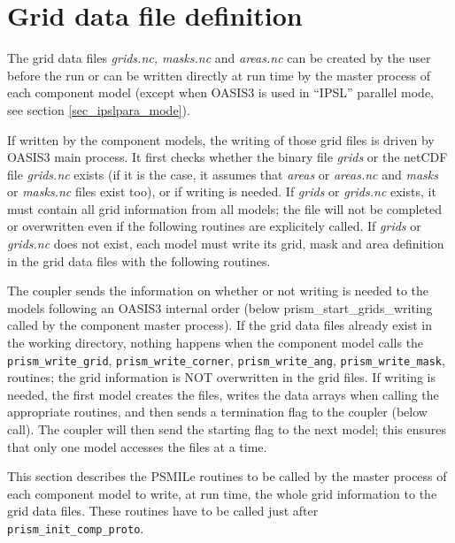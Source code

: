 \section{Grid data file definition}
\label{subsubsec_griddef}

The grid data files {\em grids.nc, masks.nc} and {\em areas.nc} can be
created by the user before the run or can be written directly at run
time by the master process of each component model (except when
  OASIS3 is used in ``IPSL'' parallel mode, see section
  \ref{sec_ipslpara_mode}).

  If written by the component models, the writing of those grid files
  is driven by OASIS3 main process. It first checks whether the binary
  file {\em grids} or the netCDF file {\em grids.nc} exists (if it is
  the case, it assumes that {\em areas} or {\em areas.nc} and {\em
    masks} or {\em masks.nc} files exist too), or if writing is
  needed. If {\em grids} or {\em grids.nc} exists, it must contain all
  grid information from all models; the file will not be completed or
  overwritten even if the following routines are explicitely
  called. If {\em grids} or {\em grids.nc} does not exist, each model
  must write its grid, mask and area definition in the grid data files
  with the following routines.

The coupler sends the information on whether or not writing is needed
to the mo\-dels following an OASIS3 internal order (below
prism\_start\_grids\_writing called by the component master process). 
If the grid data files already exist in the working directory, nothing
happens when the component model calls the {\tt prism\_write\_grid}, 
{\tt prism\_write\_corner}, {\tt prism\_write\_ang}, 
{\tt prism\_write\_mask},  routines;
the grid information is NOT overwritten in the grid files. If
writing is needed, the first model creates the files, writes the data
arrays when calling the appropriate routines,
and then sends a termination flag to the coupler (below  call). The coupler will then send the
starting flag to the next model; this ensures that only one model
accesses the files at a time.

This section describes the PSMILe routines to be called by the
master process of each component model to write, at run time, the whole
grid information to the grid data files. These routines have to
be called just after {\tt prism\_init\_comp\_proto}.

